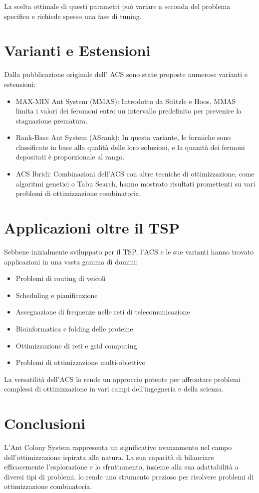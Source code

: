 La scelta ottimale di questi parametri può variare a seconda del problema specifico e richiede spesso una fase di tuning.

\section{Varianti e Estensioni}

Dalla pubblicazione originale dell' \gls{ACS} sono state proposte numerose varianti e estensioni:
\begin{itemize}
  \item MAX-MIN Ant System (\gls{MMAS}): Introdotto da Stützle e Hoos, \gls{MMAS} limita i valori dei feromoni entro un intervallo predefinito per prevenire la stagnazione prematura. \cite{Stuetzle1997}
  \item Rank-Base Ant System (\gls{ASrank}): In questa variante, le formiche sono classificate in base alla qualità delle loro soluzioni, e la quanità dei fermoni depositati è proporzionale al rango.
  \item ACS Ibridi: Combinazioni dell'ACS con altre tecniche di ottimizzazione, come algoritmi genetici o Tabu Search, hanno mostrato risultati promettenti su vari problemi di ottimizzazione combinatoria. 
\end{itemize}

\section{Applicazioni oltre il \gls{TSP}}

Sebbene inizialmente sviluppato per il \gls{TSP}, l'\gls{ACS} e le sue varianti hanno trovato applicazioni in una vasta gamma di domini:

\begin{itemize}
	\item Problemi di routing di veicoli
	\item Scheduling e pianificazione
	\item Assegnazione di frequenze nelle reti di telecomunicazione
	\item Bioinformatica e folding delle proteine
	\item Ottimizzazione di reti e grid computing
	\item Problemi di ottimizzazione multi-obiettivo
\end{itemize}

La versatilità dell'\gls{ACS} lo rende un approccio potente per affrontare problemi complessi di ottimizzazione in vari campi dell'ingegneria e della scienza.

\section{Conclusioni}

L'Ant Colony System rappresenta un significativo avanzamento nel campo dell'ottimizzazione ispirata alla natura. La sua capacità di bilanciare efficacemente l'esplorazione e lo sfruttamento, insieme alla sua adattabilità a diversi tipi di problemi, lo rende uno strumento prezioso per risolvere problemi di ottimizzazione combinatoria. \cite{Dorigo1997}


